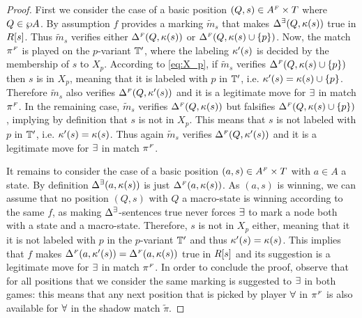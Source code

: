 \begin{proof}
First we consider the case of a basic position $(Q,s) \in A^{{\scriptscriptstyle F}} \times T$ where $Q \in \wp A$. By assumption $f$ provides a marking $\widetilde{m}_s$ that makes $\Delta^\exists(Q,\kappa(s))$ true in $R[s]$. Thus $\widetilde{m}_s$ verifies either $\Delta^{{\scriptscriptstyle F}}(Q,\kappa(s))$ or $\Delta^{{\scriptscriptstyle F}}(Q,\kappa(s)\cup \{p\})$. Now, the match $\pi^{{\scriptscriptstyle F}}$ is played on the $p$-variant $\mathbb{T}'$, where the labeling $\kappa'(s)$ is decided by the membership of $s$ to $X_p$. According to \eqref{eq:X_p}, if $\widetilde{m}_s$ verifies $\Delta^{{\scriptscriptstyle F}}(Q,\kappa(s)\cup \{p\})$ then $s$ is in $X_p$, meaning that it is labeled with $p$ in $\mathbb{T}'$, i.e. $\kappa'(s) = \kappa(s)\cup \{p\}$. Therefore $\widetilde{m}_s$ also verifies $\Delta^{{\scriptscriptstyle F}}(Q,\kappa'(s))$ and it is a legitimate move for $\exists$ in match $\pi^{{\scriptscriptstyle F}}$. In the remaining case, $\widetilde{m}_s$ verifies $\Delta^{{\scriptscriptstyle F}}(Q,\kappa(s))$ but falsifies $\Delta^{{\scriptscriptstyle F}}(Q,\kappa(s)\cup \{p\})$, implying by definition that $s$ is not in $X_p$. This means that $s$ is not labeled with $p$ in $\mathbb{T}'$, i.e. $\kappa'(s) = \kappa(s)$. Thus again $\widetilde{m}_s$ verifies $\Delta^{{\scriptscriptstyle F}}(Q,\kappa'(s))$ and it is a legitimate move for $\exists$ in match $\pi^{{\scriptscriptstyle F}}$.

It remains to consider the case of a basic position $(a,s) \in A^{{\scriptscriptstyle F}} \times T$
with $a \in A$ a state. 
By definition $\Delta^\exists(a,\kappa(s))$ is just $\Delta^{{\scriptscriptstyle F}}(a,\kappa(s))$. 
As $(a,s)$ is winning, we can assume that no position $(Q,s)$ with $Q$ a 
macro-state is winning according to the same $f$, as making $\Delta^\exists$-sentences
true never forces $\exists$ to mark a node both with a state and a macro-state. 
Therefore, $s$ is not in $X_p$ either, meaning that it it is not labeled with 
$p$ in the $p$-variant $\mathbb{T}'$ and thus $\kappa'(s) = \kappa(s)$. 
This implies that $f$ makes $\Delta^{{\scriptscriptstyle F}}(a,\kappa'(s)) = \Delta^{{\scriptscriptstyle F}}(a,\kappa(s))$
true in $R[s]$ and its suggestion is a legitimate move for $\exists$ in match
$\pi^{{\scriptscriptstyle F}}$.
In order to conclude the proof, observe that for all positions that we consider
the same marking is suggested to $\exists$ in both games: this means that any 
next position that is picked by player $\forall$ in $\pi^{{\scriptscriptstyle F}}$ is also 
available for $\forall$ in the shadow match $\tilde{\pi}$.
\medskip


\end{proof}
